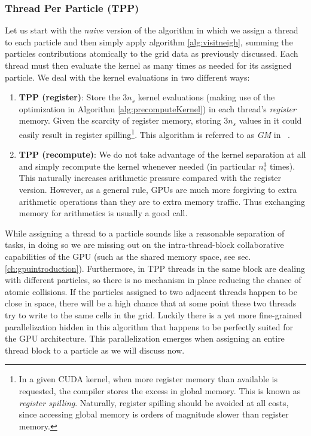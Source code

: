 \documentclass[twoside,openright,titlepage,numbers=noenddot,%
headinclude,footinclude,cleardoublepage=empty,abstract=on,
BCOR=5mm,fontsize=11pt, dvipsnames, paper=b5
]{scrreprt}
\begin{document}
\subsubsection*{Thread Per Particle (TPP)}
Let us start with the \emph{naive} version of the algorithm in which we assign a thread to each particle and then simply apply algorithm \ref{alg:visitneigh}, summing the particles contributions atomically to the grid data as previously discussed. Each thread must then evaluate the kernel as many times as needed for its assigned particle. We deal with the kernel evaluations in two different ways:
\begin{enumerate}
\item \textbf{TPP (register)}: Store the $3n_s$ kernel evaluations (making use of the optimization in Algorithm \ref{alg:precomputeKernel}) in each thread's \emph{register} memory. Given the scarcity of register memory, storing $3n_s$ values in it could easily result in register spilling\footnote{In a given CUDA kernel, when more register memory than available is requested, the compiler stores the excess in global memory. This is known as \emph{register spilling}. Naturally, register spilling should be avoided at all costs, since accessing global memory is orders of magnitude slower than register memory.}. This algorithm is referred to as \emph{GM} in ~\cite{Shih2021}.
\item \textbf{TPP (recompute)}: We do not take advantage of the kernel separation at all and simply recompute the kernel whenever needed (in particular $n_s^3$ times). This naturally increases arithmetic pressure compared with the register version. However, as a general rule, GPUs are much more forgiving to extra arithmetic operations than they are to extra memory traffic. Thus exchanging memory for arithmetics is usually a good call.
\end{enumerate}
While assigning a thread to a particle sounds like a reasonable separation of tasks, in doing so we are missing out on the intra-thread-block collaborative capabilities of the GPU (such as the shared memory space, see sec. \ref{ch:gpuintroduction}). Furthermore, in TPP threads in the same block are dealing with different particles, so there is no mechanism in place reducing the chance of atomic collisions. If the particles assigned to two adjacent threads happen to be close in space, there will be a high chance that at some point these two threads try to write to the same cells in the grid. Luckily there is a yet more fine-grained parallelization hidden in this algorithm that happens to be perfectly suited for the GPU architecture. This parallelization emerges when assigning an entire thread block to a particle as we will discuss now.
\end{document}
